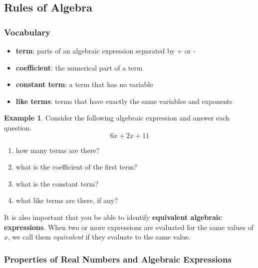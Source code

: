 \documentclass[addpoints,12pt]{exam}
\theoremstyle{definition}
\newtheorem{example}{Example}[subsection]
\begin{document}
\setcounter{section}{1}
\setcounter{subsection}{3}

\subsection{Rules of Algebra}
\subsubsection*{Vocabulary}
\begin{itemize}
\item \textbf{term}: parts of an algebraic expression separated by + or -
\item \textbf{coefficient}: the numerical part of a term
\item \textbf{constant term}: a term that has no variable
\item \textbf{like terms}: terms that have exactly the same variables and exponents
\end{itemize}
\vspace{.25in}

\begin{example}
Consider the following algebraic expression and answer each question.
\[6x + 2x + 11\]
\begin{enumerate}
\item how many terms are there?
\vspace{.1in}
\item what is the coefficient of the first term?
\vspace{.1in}
\item what is the constant term?
\vspace{.1in}
\item what like terms are there, if any?
\vspace{.1in}
\end{enumerate}
\end{example}

\noindent It is also important that you be able to identify \textbf{equivalent algebraic expressions}. When two or more expressions are evaluated for the same values of $x$, we call them \emph{equivalent} if they evaluate to the same value.

\newpage

\subsubsection*{Properties of Real Numbers and Algebraic Expressions}
\end{document}
